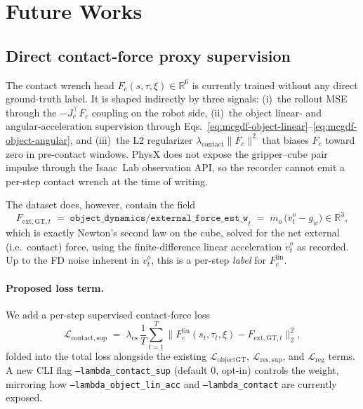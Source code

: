 \documentclass[11pt]{article}
\begin{document}
\section{Future Works}

\subsection{Direct contact-force proxy supervision}
\label{sec:future-contact-proxy}

The contact wrench head $F_c(s,\tau,\xi) \in \mathbb{R}^6$ is currently
trained without any direct ground-truth label. It is shaped indirectly by
three signals: (i)~the rollout MSE through the
$-J_c^\top F_c$ coupling on the robot side, (ii)~the object linear- and
angular-acceleration supervision through
Eqs.~\eqref{eq:mcgdf-object-linear}--\eqref{eq:mcgdf-object-angular}, and
(iii)~the L2 regularizer $\lambda_{\mathrm{contact}}\|F_c\|^2$ that biases
$F_c$ toward zero in pre-contact windows. PhysX does not expose the
gripper--cube pair impulse through the Isaac~Lab observation API, so the
recorder cannot emit a per-step contact wrench at the time of writing.

The dataset does, however, contain the field
\begin{equation}
  F_{\mathrm{ext,GT},t}
  \;=\;
  \mathtt{object\_dynamics/external\_force\_est\_w}_t
  \;=\;
  m_o\,\bigl(\dot v^o_t - g_w\bigr) \in \mathbb{R}^3,
  \label{eq:future-fext-recipe}
\end{equation}
which is exactly Newton's second law on the cube, solved for the net
external (i.e.\ contact) force, using the finite-difference linear
acceleration $\dot v^o_t$ as recorded. Up to the FD noise inherent in
$\dot v^o_t$, this is a per-step \emph{label} for $F_c^{\mathrm{lin}}$.

\paragraph{Proposed loss term.}
We add a per-step supervised contact-force loss
\begin{equation}
  \mathcal{L}_{\mathrm{contact,sup}}
  \;=\;
  \lambda_{\mathrm{cs}}
  \,\frac{1}{T}\sum_{t=1}^{T}
  \bigl\| F_c^{\mathrm{lin}}(s_t,\tau_t,\xi) - F_{\mathrm{ext,GT},t} \bigr\|_2^2,
  \label{eq:future-contact-sup-loss}
\end{equation}
folded into the total loss alongside the existing
$\mathcal{L}_{\mathrm{objectGT}}$,
$\mathcal{L}_{\mathrm{res,sup}}$, and $\mathcal{L}_{\mathrm{reg}}$ terms.
A new CLI flag \texttt{--lambda\_contact\_sup} (default $0$, opt-in)
controls the weight, mirroring how
\texttt{--lambda\_object\_lin\_acc} and \texttt{--lambda\_contact} are
currently exposed.
\end{document}
